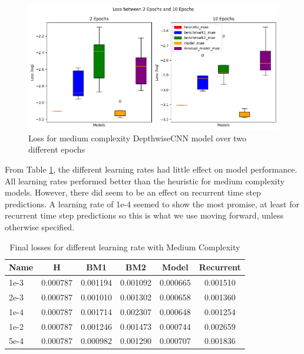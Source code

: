 \begin{figure}[tbph]
	\centering
	\includegraphics[width=0.8\linewidth, height=0.3\textheight]{Figures/Results/Diff_Complexity_Lr_Epochs/Epochs_Lr/Box_epochs}
	\caption[Loss between two different Epochs]{Loss for medium complexity DepthwiseCNN model over two different epochs}
	\label{fig:epochs}
\end{figure}

From Table \ref{tab:lr}, the different learning rates had little effect on model performance. All learning rates performed better than the heuristic for medium complexity models. However, there did seem to be an effect on recurrent time step predictions. A learning rate of 1e-4 seemed to show the most promise, at least for recurrent time step predictions so this is what we use moving  forward, unless otherwise specified.
\begin{table}[htbp]
	\centering
	\caption{Final losses for different learning rate with Medium Complexity}
	\label{tab:lr}
	\begin{tabular}{p{2cm}ccccc}
		\toprule
		Name &  H &  BM1 &  BM2 &  Model &  Recurrent \\
		\midrule
		1e-3 &       0.000787 &        0.001194 &        0.001092 &   0.000665 &            0.001510 \\
		2e-3 &       0.000787 &        0.001010 &        0.001302 &   0.000658 &            0.001360 \\
		1e-4 &       0.000787 &        0.001714 &        0.002307 &   0.000648 &            0.001254 \\
		1e-2 &       0.000787 &        0.001246 &        0.001473 &   0.000744 &            0.002659 \\
		5e-4 &       0.000787 &        0.000982 &        0.001290 &   0.000707 &            0.001836 \\
		\bottomrule
	\end{tabular}
\end{table}

